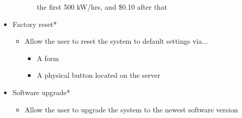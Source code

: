 \begin{itemize}
\begin{itemize}
\begin{itemize}
		 	the first 500 kW/hrs, and \$0.10 after that
		\end{itemize}
	\end{itemize}
 \item Factory reset*
	\begin{itemize}
	 \item Allow the user to reset the system to default settings via...
		\begin{itemize}
		 \item A form
		 \item A physical button located on the server
		\end{itemize}
	\end{itemize}
 \item Software upgrade*
	\begin{itemize}
	 \item Allow the user to upgrade the system to the newest software version
	\end{itemize}
\end{itemize}